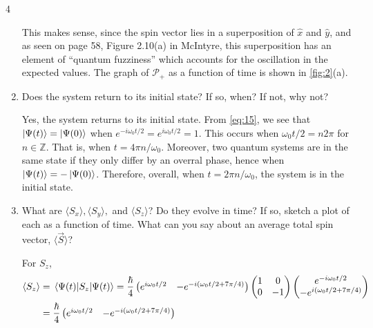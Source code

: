 \documentclass[11pt]{article}
\begin{document}
\begin{problem}{4}
\begin{enumerate}[label=(\alph*)]
\begin{answer}
        This makes sense, since the spin vector lies in a superposition of \( \hat{x} \) and \( \hat{y} \), and as seen on page 58, Figure 2.10(a) in McIntyre, this superposition has an element of ``quantum fuzziness'' which accounts for the oscillation in the expected values.
        The graph of \( \mathcal{P}_{+} \) as a function of time is shown in \cref{fig:2}(a).
        \end{answer}
  \item Does the system return to its initial state?
        If so, when?
        If not, why not?
        \begin{answer}
          Yes, the system returns to its initial state.
          From \cref{eq:15}, we see that \( \ket{\Psi(t)} = \ket{\Psi(0)} \) when \( e^{-i \omega_0 t /2} = e^{i \omega_0 t /2} = 1 \).
          This occurs when \( \omega_0 t /2 = n2\pi \) for \( n \in \mathbb{Z} \).
          That is, when \( t = 4\pi n / \omega_0\).
          Moreover, two quantum systems are in the same state if they only differ by an overral phase, hence when \( \ket{\Psi(t)} = -\ket{\Psi(0)} \).
          Therefore, overall, when \( t = 2\pi n / \omega_0 \), the system is in the initial state.
        \end{answer}
  \item What are \( \langle S_x \rangle, \langle S_y \rangle, \) and \( \langle S_z \rangle \)?
        Do they evolve in time?
        If so, sketch a plot of each as a function of time.
        What can you say about an average total spin vector, \( \langle \vec{S} \rangle \)?
        \begin{answer}
          For \( S_z \),
          \begin{equation}
          \label{eq:18}
          \begin{aligned}
            \langle S_z \rangle &= \ev{S_z}{\Psi(t)} = \frac{\hbar}{4} \begin{pmatrix}
e^{i\omega_0 t /2}  & -e^{-i(\omega_0 t /2 + 7\pi/4)}
 \end{pmatrix} \begin{pmatrix}
1  & 0 \\
0  & -1
 \end{pmatrix} \begin{pmatrix}
e^{-i\omega_0 t/2} \\
-e^{i(\omega_0 t/2 + 7\pi/4)}
 \end{pmatrix} \\
            &= \frac{\hbar}{4} \begin{pmatrix}
e^{i\omega_0 t /2}  & -e^{-i(\omega_0 t /2 + 7\pi/4)}

\end{pmatrix}
\end{aligned}
\end{equation}
\end{answer}
\end{enumerate}
\end{problem}
\end{document}
